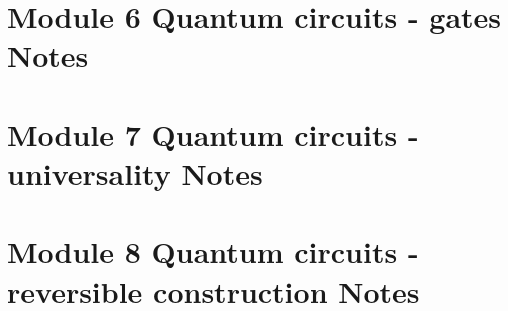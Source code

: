 \section{Module 6 Quantum circuits - gates Notes}


\section{Module 7 Quantum circuits - universality Notes}


\section{Module 8 Quantum circuits - reversible construction Notes}


\begin{comment}

\section{Module 1 Quantum Strangeness}


\section{Module 2 Quantum Linear Algebra, Part I}


\section{Module 3 The Single Qubit}


\section{Module 4: Quantum linear algebra, part II}


\section{Module 5: Multiple qubits, part I}


\section{Module 6: Multiple qubits, part II}


\section{Module 7: Interlude: Principles of quantum mechanics}



\end{comment}

